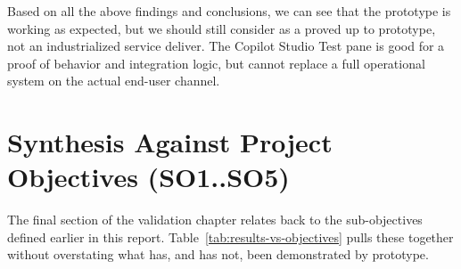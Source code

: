 Based on all the above findings and conclusions, we can see that the prototype is working as expected, but we should still consider as a proved up to prototype, not an industrialized service deliver. The Copilot Studio Test pane is good for a proof of behavior and integration logic, but cannot replace a full operational system on the actual end-user channel.
\section{\textcolor[HTML]{0066CC}{Synthesis Against Project Objectives (SO1..SO5)}}

The final section of the validation chapter relates back to the sub-objectives defined earlier in this report. Table~\ref{tab:results-vs-objectives} pulls these together without overstating what has, and has not, been demonstrated by prototype.

